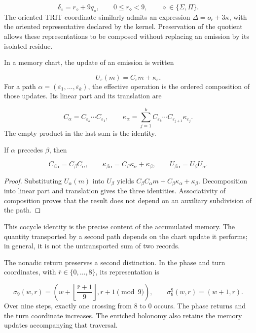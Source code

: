 \[
\delta_\diamond=r_\diamond+9q_\diamond,
\qquad 0\leq r_\diamond<9,
\qquad \diamond\in\{\Sigma,\Pi\}.
\]
The oriented TRIT coordinate similarly admits an expression \(\Delta=o_r+3\kappa\), with the oriented representative declared by the kernel. Preservation of the quotient allows these representations to be composed without replacing an emission by its isolated residue.

In a memory chart, the update of an emission is written

\[
U_\varepsilon(m)=C_\varepsilon m+\kappa_\varepsilon.
\]
For a path \(\alpha=(\varepsilon_1,\ldots,\varepsilon_k)\), the effective operation is the ordered composition of those updates. Its linear part and its translation are

\[
C_\alpha=C_{\varepsilon_k}\cdots C_{\varepsilon_1},
\qquad
\kappa_\alpha=
\sum_{j=1}^{k}C_{\varepsilon_k}\cdots
C_{\varepsilon_{j+1}}\kappa_{\varepsilon_j}.
\]
The empty product in the last sum is the identity.

\begin{proposition}
\label{act21:prop:continuo-compatibilidad-afin}
If \(\alpha\) precedes \(\beta\), then

\[
C_{\beta\alpha}=C_\beta C_\alpha,
\qquad
\kappa_{\beta\alpha}=C_\beta\kappa_\alpha+\kappa_\beta,
\qquad
U_{\beta\alpha}=U_\beta U_\alpha.
\]
\end{proposition}
\begin{proof}
Substituting \(U_\alpha(m)\) into \(U_\beta\) yields \(C_\beta C_\alpha m+C_\beta\kappa_\alpha+\kappa_\beta\). Decomposition into linear part and translation gives the three identities. Associativity of composition proves that the result does not depend on an auxiliary subdivision of the path.
\end{proof}

This cocycle identity is the precise content of the accumulated memory. The quantity transported by a second path depends on the chart update it performs; in general, it is not the untransported sum of two records.

The nonadic return preserves a second distinction. In the phase and turn coordinates, with \(\bar r\in\{0,\ldots,8\}\), its representation is

\[
\sigma_9(w,r)=
\left(w+\left\lfloor\frac{\bar r+1}{9}\right\rfloor,
r+1\pmod9\right),
\qquad
\sigma_9^9(w,r)=(w+1,r).
\]
Over nine steps, exactly one crossing from \(8\) to \(0\) occurs. The phase returns and the turn coordinate increases. The enriched holonomy also retains the memory updates accompanying that traversal.

